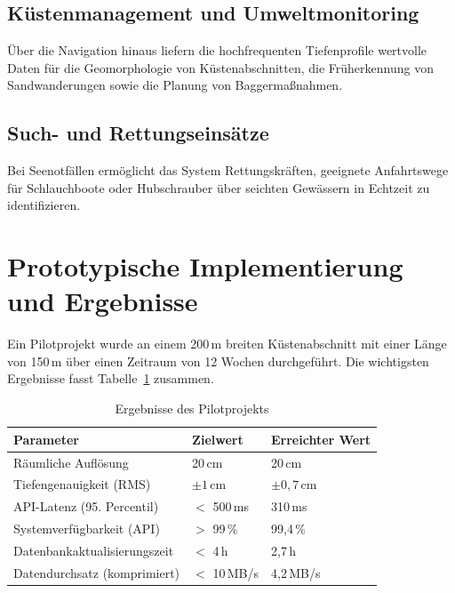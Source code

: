 ﻿\documentclass[a4paper,12pt]{article}
\theoremstyle{definition}
\begin{document}
\subsection{Küstenmanagement und Umweltmonitoring}

Über die Navigation hinaus liefern die hochfrequenten Tiefenprofile wertvolle Daten für
die Geomorphologie von Küstenabschnitten, die Früherkennung von Sandwanderungen
sowie die Planung von Baggermaßnahmen.

\subsection{Such- und Rettungseinsätze}

Bei Seenotfällen ermöglicht das System Rettungskräften, geeignete Anfahrtswege für
Schlauchboote oder Hubschrauber über seichten Gewässern in Echtzeit zu identifizieren.

\section{Prototypische Implementierung und Ergebnisse}

Ein Pilotprojekt wurde an einem 200\,m breiten Küstenabschnitt mit einer Länge von
150\,m über einen Zeitraum von 12 Wochen durchgeführt. Die wichtigsten Ergebnisse
fasst Tabelle~\ref{tab:ergebnisse} zusammen.

\begin{table}[H]
\centering
\caption{Ergebnisse des Pilotprojekts}
\label{tab:ergebnisse}
\renewcommand{\arraystretch}{1.3}
\begin{tabular}{@{}lll@{}}
\toprule
\textbf{Parameter} & \textbf{Zielwert} & \textbf{Erreichter Wert} \\
\midrule
Räumliche Auflösung & 20\,cm & 20\,cm \\
Tiefengenauigkeit (RMS) & $\pm 1\,\text{cm}$ & $\pm 0{,}7\,\text{cm}$ \\
API-Latenz (95. Percentil) & $<$ 500\,ms & 310\,ms \\
Systemverfügbarkeit (API) & $>$ 99\,\% & 99{,}4\,\% \\
Datenbankaktualisierungszeit & $<$ 4\,h & 2{,}7\,h \\
Datendurchsatz (komprimiert) & $<$ 10\,MB/s & 4{,}2\,MB/s \\
\bottomrule
\end{tabular}
\end{table}
\end{document}
